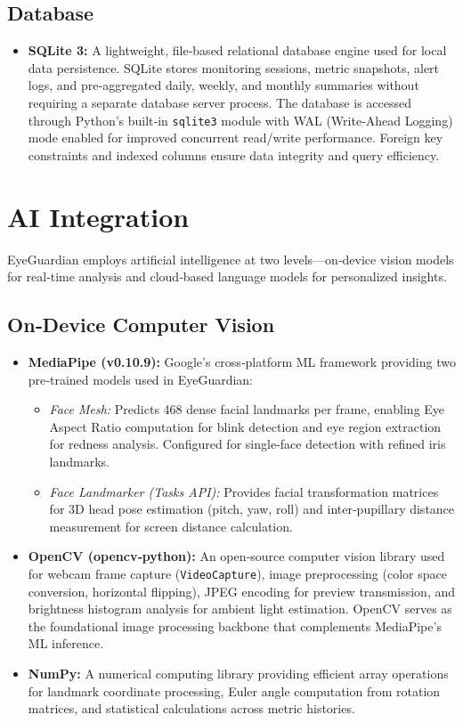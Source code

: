 \documentclass[12pt]{report}
\begin{document}
\subsection{Database}

\begin{itemize}
    \item \textbf{SQLite 3:} A lightweight, file‑based relational database engine used for local data persistence. SQLite stores monitoring sessions, metric snapshots, alert logs, and pre‑aggregated daily, weekly, and monthly summaries without requiring a separate database server process. The database is accessed through Python's built‑in \texttt{sqlite3} module with WAL (Write‑Ahead Logging) mode enabled for improved concurrent read/write performance. Foreign key constraints and indexed columns ensure data integrity and query efficiency.
\end{itemize}

\section{AI Integration}

EyeGuardian employs artificial intelligence at two levels—on‑device vision models for real‑time analysis and cloud‑based language models for personalized insights.

\subsection{On‑Device Computer Vision}

\begin{itemize}
    \item \textbf{MediaPipe (v0.10.9):} Google's cross‑platform ML framework providing two pre‑trained models used in EyeGuardian:
    \begin{itemize}
        \item \textit{Face Mesh:} Predicts 468 dense facial landmarks per frame, enabling Eye Aspect Ratio computation for blink detection and eye region extraction for redness analysis. Configured for single‑face detection with refined iris landmarks.
        \item \textit{Face Landmarker (Tasks API):} Provides facial transformation matrices for 3D head pose estimation (pitch, yaw, roll) and inter‑pupillary distance measurement for screen distance calculation.
    \end{itemize}
    \item \textbf{OpenCV (opencv‑python):} An open‑source computer vision library used for webcam frame capture (\texttt{VideoCapture}), image preprocessing (color space conversion, horizontal flipping), JPEG encoding for preview transmission, and brightness histogram analysis for ambient light estimation. OpenCV serves as the foundational image processing backbone that complements MediaPipe's ML inference.
    \item \textbf{NumPy:} A numerical computing library providing efficient array operations for landmark coordinate processing, Euler angle computation from rotation matrices, and statistical calculations across metric histories.
\end{itemize}
\end{document}
